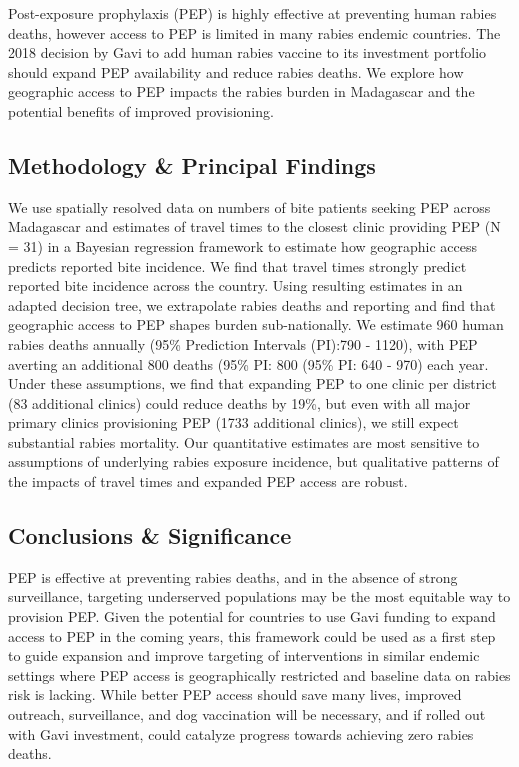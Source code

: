 \documentclass[
  oneside]{book}
\begin{document}
Post-exposure prophylaxis (PEP) is highly effective at preventing human
rabies deaths, however access to PEP is limited in many rabies endemic
countries. The 2018 decision by Gavi to add human rabies vaccine to its
investment portfolio should expand PEP availability and reduce rabies
deaths. We explore how geographic access to PEP impacts the rabies
burden in Madagascar and the potential benefits of improved
provisioning.

\hypertarget{methodology-principal-findings}{%
\subsection*{Methodology \& Principal Findings}\label{methodology-principal-findings}}

We use spatially resolved data on numbers of bite patients seeking PEP
across Madagascar and estimates of travel times to the closest clinic
providing PEP (N = 31) in a Bayesian regression framework to estimate
how geographic access predicts reported bite incidence. We find that
travel times strongly predict reported bite incidence across the
country. Using resulting estimates in an adapted decision tree, we
extrapolate rabies deaths and reporting and find that geographic access
to PEP shapes burden sub-nationally. We estimate 960 human rabies deaths
annually (95\% Prediction Intervals (PI):790 - 1120), with PEP averting
an additional 800 deaths (95\% PI: 800 (95\% PI: 640 - 970) each year.
Under these assumptions, we find that expanding PEP to one clinic per
district (83 additional clinics) could reduce deaths by 19\%, but even
with all major primary clinics provisioning PEP (1733 additional
clinics), we still expect substantial rabies mortality. Our quantitative
estimates are most sensitive to assumptions of underlying rabies
exposure incidence, but qualitative patterns of the impacts of travel
times and expanded PEP access are robust.

\hypertarget{conclusions-significance}{%
\subsection*{Conclusions \& Significance}\label{conclusions-significance}}

PEP is effective at preventing rabies deaths, and in the absence of
strong surveillance, targeting underserved populations may be the most
equitable way to provision PEP. Given the potential for countries to use
Gavi funding to expand access to PEP in the coming years, this framework
could be used as a first step to guide expansion and improve targeting
of interventions in similar endemic settings where PEP access is
geographically restricted and baseline data on rabies risk is lacking.
While better PEP access should save many lives, improved outreach,
surveillance, and dog vaccination will be necessary, and if rolled out
with Gavi investment, could catalyze progress towards achieving zero
rabies deaths.
\end{document}
